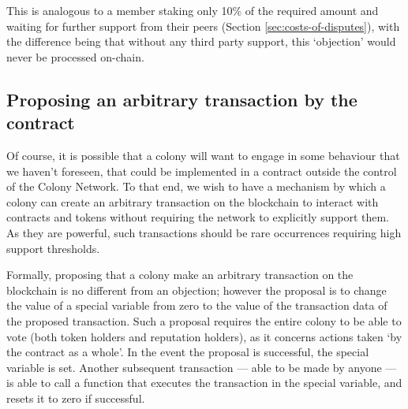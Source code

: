 This is analogous to a member staking only 10\% of the required amount and waiting for further support from their peers (Section \ref{sec:costs-of-disputes}), with the difference being that without any third party support, this `objection' would never be processed on-chain.

\subsection{Proposing an arbitrary transaction by the  contract}\label{sec:arbitrary-transaction}
Of course, it is possible that a colony will want to engage in some behaviour that we haven't foreseen, that could be implemented in a contract outside the control of the Colony Network. To that end, we wish to have a mechanism by which a colony can create an arbitrary transaction on the blockchain to interact with contracts and tokens without requiring the network to explicitly support them. As they are powerful, such transactions should be rare occurrences requiring high support thresholds.

Formally, proposing that a colony make an arbitrary transaction on the blockchain is no different from an objection; however the proposal is to change the value of a special variable from zero to the value of the transaction data of the proposed transaction. Such a proposal requires the entire colony to be able to vote (both token holders and reputation holders), as it concerns actions taken `by the contract as a whole'. In the event the proposal is successful, the special variable is set. Another subsequent transaction --- able to be made by anyone --- is able to call a function that executes the transaction in the special variable, and resets it to zero if successful.
